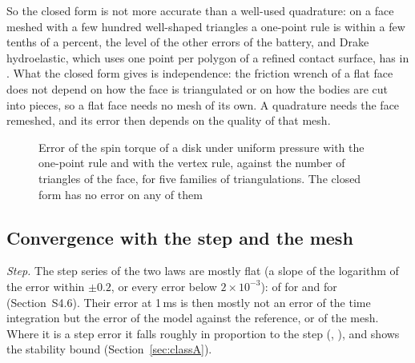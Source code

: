 So the closed form is not more accurate than a well-used quadrature: on a face meshed with a
few hundred well-shaped triangles a one-point rule is within a few tenths of a percent, the
level of the other errors of the battery, and Drake hydroelastic, which uses one point per
polygon of a refined contact surface, has  in . What the
closed form gives is independence: the friction wrench of a flat face does not depend on how
the face is triangulated or on how the bodies are cut into pieces, so a flat face needs no mesh
of its own. A quadrature needs the face remeshed, and its error then depends on the quality of
that mesh.

\begin{table}[t]
\caption{The friction quadratures on one flat face, apart from the battery: error [\%] of the
friction torque of a face spinning in place under uniform pressure, and of the torque and the
force (the latter over $\mu$ times the load) of a face sliding and spinning under a tilted
pressure, against the closed form, which is the same on every triangulation. Negative: too
little torque}
\label{tab:triangulation}
\end{table}

\begin{figure}[t]
\centering
{}
\caption{Error of the spin torque of a disk under uniform pressure with the one-point rule and
with the vertex rule, against the number of triangles of the face, for five families of
triangulations. The closed form has no error on any of them}
\label{fig:triangulation}
\end{figure}

\subsection{Convergence with the step and the mesh}\label{sec:convergence}

\emph{Step.} The step series of the two laws are mostly flat (a slope of the logarithm of the
error within $\pm0.2$, or every error below $2\times10^{-3}$): 
of  for  and  for
 (Section~S4.6). Their error at 1\,ms is then mostly not an error of the time
integration but the error of the model against the reference, or of the mesh. Where it is a
step error it falls roughly in proportion to the step (, ), and
 shows the stability bound (Section~\ref{sec:classA}).

